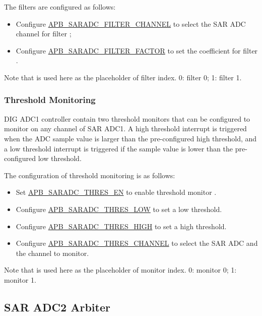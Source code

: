 \documentclass[main\_\_EN.tex]{subfiles}
\begin{document}
The filters are configured as follows:
\begin{itemize}
\item Configure \hyperref[fielddesc:APBSARADCFILTERCHANNEL1]{APB\_SARADC\_FILTER\_CHANNEL} to select the SAR ADC channel for filter ;
\item Configure \hyperref[fielddesc:APBSARADCFILTERCHANNEL1]{APB\_SARADC\_FILTER\_FACTOR} to set the coefficient for filter .
\end{itemize}


Note that  is used here as the placeholder of filter index. 0: filter 0; 1: filter 1.

\subsubsection{Threshold Monitoring}

DIG ADC1 controller contain two threshold monitors that can be configured to monitor on any channel of SAR ADC1. A high threshold interrupt is triggered when the ADC sample value is larger than the pre-configured high threshold, and a low threshold interrupt is triggered if the sample value is lower than the pre-configured low threshold.

The configuration of threshold monitoring is as follows:
\begin{itemize}
    \item Set \hyperref[fielddesc:APBSARADCTHRESALLEN]{APB\_SARADC\_THRES\_EN} to enable threshold monitor .
    \item Configure \hyperref[fielddesc:APBSARADCTHRES1LOW]{APB\_SARADC\_THRES\_LOW} to set a low threshold.
    \item Configure \hyperref[fielddesc:APBSARADCTHRES1LOW]{APB\_SARADC\_THRES\_HIGH} to set a high threshold.
    \item Configure \hyperref[fielddesc:APBSARADCTHRES1LOW]{APB\_SARADC\_THRES\_CHANNEL} to select the SAR ADC and the channel to monitor.
\end{itemize}

Note that  is used here as the placeholder of monitor index. 0: monitor 0; 1: monitor 1.



\subsection{SAR ADC2 Arbiter}
\end{document}
